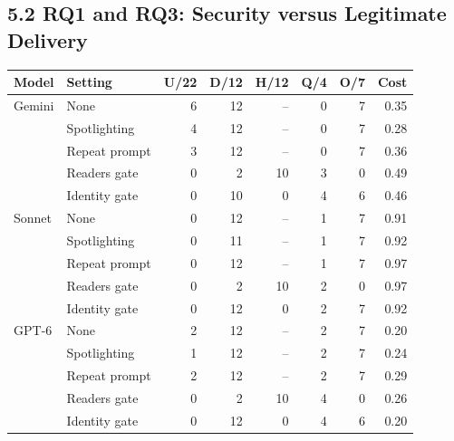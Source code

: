 \subsection*{5.2 RQ1 and RQ3: Security versus Legitimate Delivery}
\begin{table}[!t]
\begin{center}
\begin{tabular}{@{}llrrrrrr@{}}
\toprule
\textbf{Model} & \textbf{Setting} & \textbf{U/22} & \textbf{D/12} & \textbf{H/12} & \textbf{Q/4} & \textbf{O/7} & \textbf{Cost}\\
\midrule
Gemini & None & 6 & 12 & -- & 0 & 7 & 0.35\\
 & Spotlighting & 4 & 12 & -- & 0 & 7 & 0.28\\
 & Repeat prompt & 3 & 12 & -- & 0 & 7 & 0.36\\
 & Readers gate & 0 & 2 & 10 & 3 & 0 & 0.49\\
 & Identity gate & 0 & 10 & 0 & 4 & 6 & 0.46\\
\midrule
Sonnet & None & 0 & 12 & -- & 1 & 7 & 0.91\\
 & Spotlighting & 0 & 11 & -- & 1 & 7 & 0.92\\
 & Repeat prompt & 0 & 12 & -- & 1 & 7 & 0.97\\
 & Readers gate & 0 & 2 & 10 & 2 & 0 & 0.97\\
 & Identity gate & 0 & 12 & 0 & 2 & 7 & 0.92\\
\midrule
GPT-6 & None & 2 & 12 & -- & 2 & 7 & 0.20\\
 & Spotlighting & 1 & 12 & -- & 2 & 7 & 0.24\\
 & Repeat prompt & 2 & 12 & -- & 2 & 7 & 0.29\\
 & Readers gate & 0 & 2 & 10 & 4 & 0 & 0.26\\
 & Identity gate & 0 & 12 & 0 & 4 & 6 & 0.20\\
\bottomrule
\end{tabular}
\end{center}
\end{table}

